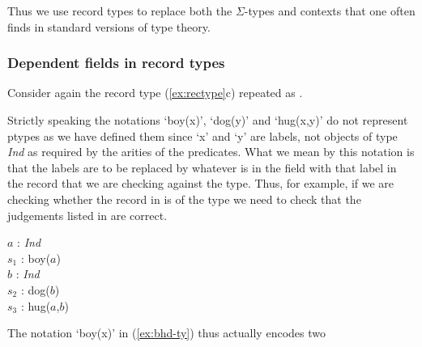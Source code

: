 Thus we use record types to replace both the $\Sigma$-types and
contexts that one often finds in standard versions of type theory.

\subsubsection{Dependent fields in record types}
\label{sec:depfields}
Consider again the record type (\ref{ex:rectype}c) repeated as
\nexteg{}.
\begin{ex} 
\label{ex:bhd-ty}
\end{ex} 
Strictly speaking the notations `boy(x)', `dog(y)' and `hug(x,y)' do
not represent ptypes as we have defined them since `x' and `y' are
labels, not objects of type \textit{Ind} as required by the arities of
the predicates.  What we mean by this notation is that the labels are
to be replaced by whatever is in the field with that label in the
record that we are checking against the type.  Thus, for example, if
we are checking whether the record in  is of the type
\preveg{} we need to check that the judgements listed in 
are correct.
\begin{ex} 
\begin{subex} 
 
\item {}
 
\item $a$ : \textit{Ind}\\
      $s_1$ : boy($a$)\\
      $b$ : \textit{Ind}\\
      $s_2$ : dog($b$)\\
      $s_3$ : hug($a$,$b$)
 
\end{subex} 
   
\end{ex} 
The notation `boy(x)' in (\ref{ex:bhd-ty}) thus actually encodes two
